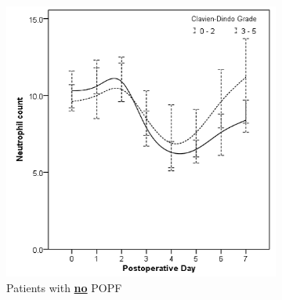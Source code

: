 \clearpage
\begin{figure}[t]
	\caption{Relationship between postoperative neutrophil count and clinically significant infective complications in patients without (A) and with (B) POPF.}
	\label{fig:crp_comp_Neutrophil_infective_leak}
	\centering
	\begin{subfigure}{0.48\textwidth}
		\centering
		\includegraphics[width=\textwidth]{Figures/crp_comp_Neutrophil_infective_leak0}
		\caption{Patients with \textbf{\underline{no}} POPF}
		\label{fig:crp_comp_Neutrophil_infective_leak0}
	\end{subfigure}
	\hfill
	\begin{subfigure}{0.48\textwidth}
		\centering

\end{subfigure}
\end{figure}
